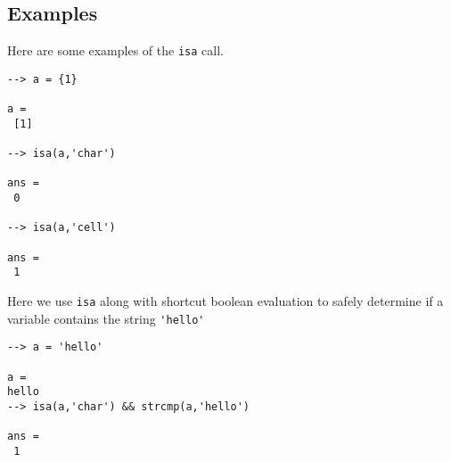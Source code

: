 \subsection{Examples}

Here are some examples of the \verb|isa| call.
\begin{verbatim}
--> a = {1}

a = 
 [1] 

--> isa(a,'char')

ans = 
 0 

--> isa(a,'cell')

ans = 
 1 
\end{verbatim}
Here we use \verb|isa| along with shortcut boolean evaluation to 
safely determine if a variable contains the string \verb|'hello'|
\begin{verbatim}
--> a = 'hello'

a = 
hello
--> isa(a,'char') && strcmp(a,'hello')

ans = 
 1 
\end{verbatim}
